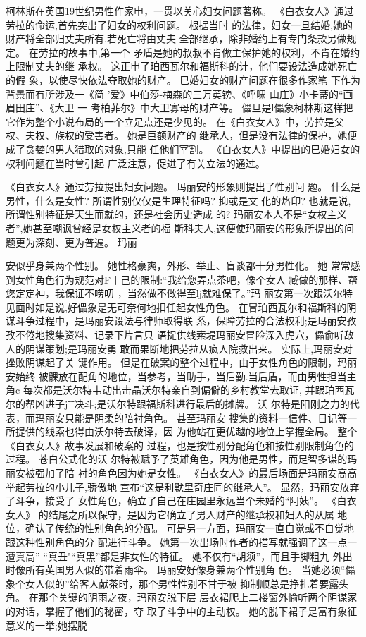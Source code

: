 \documentclass[a4paper]{article}
\begin{document}
柯林斯在英国19世纪男性作家申，一贯以关心妇女问题著称。
《白衣女人》通过劳拉的命运,首先突出了妇女的权利问题。 根据当时
的法律，妇女一旦结婚,她的财产将全部归丈夫所有,若死亡将由丈夫
全部继承，除非婚约上有专门条款另做规定。 在劳拉的故事中,第一个
矛盾是她的叔叔不肯做主保护她的权利，不肯在婚约上限制丈夫的继
承权。 这正申了珀西瓦尔和福斯科的计，他们要设法造成她死亡的假
象，以使尽快依法夺取她的财产。 巳婚妇女的财产问题在很多作家笔
下作为背景而有所涉及一《简 '爱》中伯莎-梅森的三万英镑、《呼啸
山庄》小卡蒂的“画眉田庄”、《大卫 一 考柏菲尔》中大卫寡母的财产等。
儡旦是l儡象柯林斯这样把它作为整个小说布局的一个立足点还是少见的。
在《白衣女人》中，劳拉是父权、夫权、族权的受害者。 她是巨额财产的
继承人，但是没有法律的保护，她便成了贪婪的男人猎取的对象,只能
任他们宰割。 《白衣女人》中提出的巳婚妇女的权利间题在当时曾引起
广泛注意，促进了有关立法的通过。

《白衣女人》通过劳拉提出妇女问题。 玛丽安的形象则提出了性别问
题。 什么是男性，什么是女性? 所谓性别仅仅是生理特征吗? 抑或是文
化的烙印? 也就是说,所谓性别特征是天生而就的，还是社会历史造成
的? 玛丽安本人不是“女权主义者”,她甚至嘲讽曾经是女权主义者的福
斯科夫人,这便使玛丽安的形象所提出的问题更为深刻、更为普遍。 玛丽

安似乎身兼两个性别。 她性格豪爽，外形、举止、盲谈都十分男性化。 她
常常感到女性角色行为规范对F丨己的限制:“我给您弄点茶吧，像个女人
臧做的那样、帮您定定神，我保证不唠叨ˉ，当然做不做得至lj就难保了。”玛
丽安第一次跟沃尔特见面时如是说,好儡象是无可奈何地扣任起女性角色。
在冒珀西瓦尔和福斯科的阴谋斗争过程中，是玛丽安设法与律师取得联
系，保障劳拉的合法权利;是玛丽安孜孜不倦地搜集资料、记录下片言只
语捉供线索堤玛丽安冒险深入虎穴，儡俞听敌人的阴谋策划;是玛丽安勇
敢而果断地把劳拉从疯人院救出来。 实际上,玛丽安对挫败阴谋起了关
键作用。 但是在破案的整个过程中，由于女性角色的限制，玛丽安始终
被髁放在配角的地位，当参考，当助手，当后勤.当后盾，而由男性担当主
角c 每次都是沃尔特韦动出击晶沃尔特亲自到偏僻的乡村教堂去取证,
并跟珀西瓦尔的帮凶进子jˉˉ决斗;是沃尔特跟福斯科进行最后的摊牌。 沃
尔特是阳刚之力的代表，而玛丽安只能是阴柔的陪衬角色。 甚至玛丽安
搜集的资料一信件、日记等一所提供的线索也得由沃尔特去破译，因
为他站在更优越的地位上掌握全局。 整个《白衣女人》故事发展和破案的
过程，也是按性别分配角色和按性别限制角色的过程。 苍白公式化的沃
尔特被赋予了英雄角色，因为他是男性，而足智多谋的玛丽安被强加了陪
衬的角色因为她是女性。
《白衣女人》的最后场面是玛丽安高高举起劳拉的小儿子,骄傲地
宣布“这是利默里奇庄同的继承人”。 显然，玛丽安放弃了斗争，接受了
女性角色，确立了自己在庄园里永远当个未婚的“阿姨”。 《白衣女人》
的结尾之所以保守，是因为它确立了男人财产的继承权和妇人的从属
地位，确认了传统的性别角色的分配。
可是另一方面，玛丽安一直自觉或不自觉地跟这种性别角色的分
配进行斗争。 她第一次出场时作者的描写就强调了这一点一遭真高”
“真丑"“真黑”都是非女性的特征。 她不仅有“胡须”，而且手脚粗九
外出时像所有英国男人似的带着雨伞。 玛丽安好像身兼两个性别角
色。 当她必须“儡象个女人似的”给客人献茶时，那个男性性别不甘于被
抑制顺总是挣扎着要露头角。 在那个关键的阴雨之夜，玛丽安脱下层
层衣裙爬上二楼窗外愉听两个阴谋家的对话，掌握了他们的秘密，夺
取了斗争中的主动权。 她的脱下裙子是富有象征意义的一举;她摆脱
\end{document}
